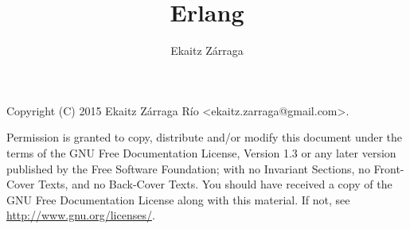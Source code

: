 \documentclass[a4paper,10pt]{article}
\title{Erlang}
\author{Ekaitz Zárraga}
\begin{document}
\maketitle

\begin{abstract}
\end{abstract}

\newpage
Copyright (C)  2015  Ekaitz Zárraga Río \textless ekaitz.zarraga@gmail.com\textgreater.

Permission is granted to copy, distribute and/or modify this document under the terms of the GNU Free
Documentation License, Version 1.3 or any later version published by the Free Software Foundation; with
no Invariant Sections, no Front-Cover Texts, and no Back-Cover Texts. You should have received a copy of
the GNU Free Documentation License along with this material. If not, see \url{http://www.gnu.org/licenses/}.
\newpage

\newpage
  \tableofcontents
\newpage
{}





\end{document}
